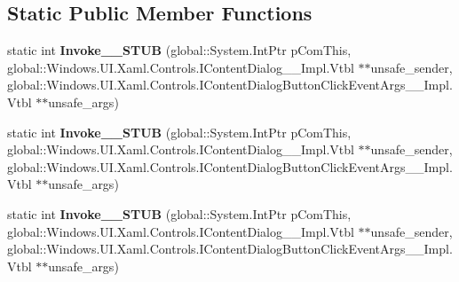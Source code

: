 \subsection*{Static Public Member Functions}
\begin{DoxyCompactItemize}
\item 
\mbox{\label{struct_windows_1_1_foundation_1_1_typed_event_handler___a___windows___u_i___xaml___controls___co8b92684606b505f49919e89761d7b36c_a865e509fab8ed22086c7f60bb6396c5d}} 
static int {\bfseries Invoke\+\_\+\+\_\+\+S\+T\+UB} (global\+::\+System.\+Int\+Ptr p\+Com\+This, global\+::\+Windows.\+U\+I.\+Xaml.\+Controls.\+I\+Content\+Dialog\+\_\+\+\_\+\+Impl.\+Vtbl $\ast$$\ast$unsafe\+\_\+sender, global\+::\+Windows.\+U\+I.\+Xaml.\+Controls.\+I\+Content\+Dialog\+Button\+Click\+Event\+Args\+\_\+\+\_\+\+Impl.\+Vtbl $\ast$$\ast$unsafe\+\_\+args)
\item 
\mbox{\label{struct_windows_1_1_foundation_1_1_typed_event_handler___a___windows___u_i___xaml___controls___co8b92684606b505f49919e89761d7b36c_a865e509fab8ed22086c7f60bb6396c5d}} 
static int {\bfseries Invoke\+\_\+\+\_\+\+S\+T\+UB} (global\+::\+System.\+Int\+Ptr p\+Com\+This, global\+::\+Windows.\+U\+I.\+Xaml.\+Controls.\+I\+Content\+Dialog\+\_\+\+\_\+\+Impl.\+Vtbl $\ast$$\ast$unsafe\+\_\+sender, global\+::\+Windows.\+U\+I.\+Xaml.\+Controls.\+I\+Content\+Dialog\+Button\+Click\+Event\+Args\+\_\+\+\_\+\+Impl.\+Vtbl $\ast$$\ast$unsafe\+\_\+args)
\item 
\mbox{\label{struct_windows_1_1_foundation_1_1_typed_event_handler___a___windows___u_i___xaml___controls___co8b92684606b505f49919e89761d7b36c_a865e509fab8ed22086c7f60bb6396c5d}} 
static int {\bfseries Invoke\+\_\+\+\_\+\+S\+T\+UB} (global\+::\+System.\+Int\+Ptr p\+Com\+This, global\+::\+Windows.\+U\+I.\+Xaml.\+Controls.\+I\+Content\+Dialog\+\_\+\+\_\+\+Impl.\+Vtbl $\ast$$\ast$unsafe\+\_\+sender, global\+::\+Windows.\+U\+I.\+Xaml.\+Controls.\+I\+Content\+Dialog\+Button\+Click\+Event\+Args\+\_\+\+\_\+\+Impl.\+Vtbl $\ast$$\ast$unsafe\+\_\+args)
\item 

\end{DoxyCompactItemize}
